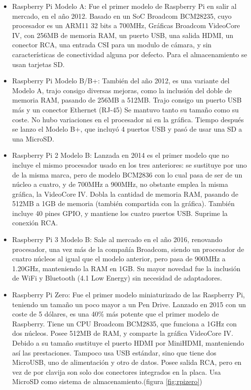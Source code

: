 \begin{itemize}
\item Raspberry Pi Modelo A: Fue el primer modelo de Raspberry Pi en salir al mercado, en el año 2012. Basado en un SoC Broadcom BCM28235, cuyo procesador es un ARM11 32 bits a 700MHz, Gráficas Broadcom VideoCore IV, con 256MB de memoria RAM, un puerto USB, una salida HDMI, un conector RCA, una entrada CSI para un modulo de cámara, y sin características de conectividad alguna por defecto. Para el almacenamiento se usan tarjetas SD. 
\item Raspberry Pi Modelo B/B+: También del año 2012, es una variante del Modelo A, trajo consigo diversas mejoras, como la inclusión del doble de memoria RAM, pasando de 256MB a 512MB. Trajo consigo un puerto USB más y un conector Ethernet (RJ-45) Se mantuvo tanto su tamaño como su coste. No hubo variaciones en el procesador ni en la gráfica. Tiempo después se lanzo el Modelo B+, que incluyó 4 puertos USB y pasó de usar una SD a una MicroSD.
\item Raspberry Pi 2 Modelo B: Lanzada en 2014 es el primer modelo que no incluye el mismo procesador usado en los tres anteriores: se sustituye por uno de la misma marca, pero de modelo BCM2836 con lo cual pasa de ser de un núcleo a cuatro, y de 700MHz a 900MHz, no obstante emplea la misma gráfica, la VideoCore IV. Dobla la cantidad de memoria RAM, pasando de 512MB a 1GB de memoria (también compartida con la gráfica). También incluye 40 pines GPIO, y mantiene los cuatro puertos USB. Suprime la conexión RCA.
\item Raspberry Pi 3 Modelo B: Sale al mercado en el año 2016, renovando procesador, una vez más de la compañía Broadcom, siendo un procesador de cuatro núcleos al igual que el modelo anterior, pero pasa de 900MHz a 1.20GHz,  manteniendo la RAM en 1GB. Su mayor novedad fue la inclusión de WiFi y Bluetooth (4.1 Low Energy) sin necesidad de adaptadores.
\item Raspberry Pi Zero: Fue el primer modelo miniaturizado de las Raspberry Pi, teniendo un tamaño un poco mayor a un Pen Drive. Lanzado en 2015 con un coste de 5 dólares, es una 40\% más potente que el primer modelo de Raspberry. Tiene un CPU Broadcom BCM2835, que funciona a 1GHz con dos núcleos. Posee 512MB de RAM, y comparte la gráfica VideoCore IV. Debido a su tamaño sustituye el puerto HDMI por MiniHDMI, manteniendo así las prestaciones. Tampoco usa USB estándar, sino que tiene dos MicroUSB, uno de alimentación y otro de datos. Posee salida RCA, pero en vez de por clavija son solo dos conectores integrados en la placa. Usa MicroSD como sistema de almacenamiento.(figura \ref{fig:rpizero})


\end{itemize}
